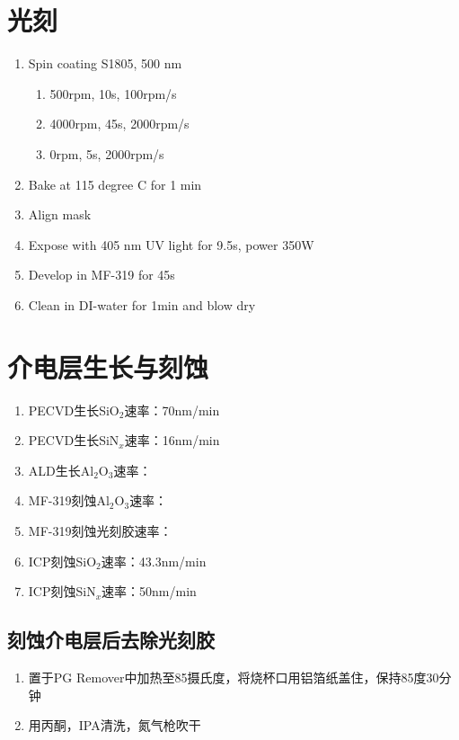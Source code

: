 \section{光刻} %
\label{sec:光刻}
    \begin{enumerate}
        \item Spin coating S1805, 500 nm
        \begin{enumerate}
            \item 500rpm, 10s, 100rpm/s
            \item 4000rpm, 45s, 2000rpm/s
            \item 0rpm, 5s, 2000rpm/s
        \end{enumerate}
        \item Bake at 115 degree C for 1 min
        \item Align mask
        \item Expose with 405 nm UV light for 9.5s, power 350W
        \item Develop in MF-319 for 45s
        \item Clean in DI-water for 1min and blow dry
    \end{enumerate}

\section{介电层生长与刻蚀} %
\label{sec:介电层生长与刻蚀}
    \begin{enumerate}
        \item PECVD生长SiO$_2$速率：70nm/min
        \item PECVD生长SiN$_x$速率：16nm/min
        \item ALD生长Al$_2$O$_3$速率：
        \item MF-319刻蚀Al$_2$O$_3$速率：
        \item MF-319刻蚀光刻胶速率：
        \item ICP刻蚀SiO$_2$速率：43.3nm/min
        \item ICP刻蚀SiN$_x$速率：50nm/min
    \end{enumerate}
    \subsection{刻蚀介电层后去除光刻胶} %
    \label{sub:刻蚀介电层后去除光刻胶}
        \begin{enumerate}
            \item 置于PG Remover中加热至85摄氏度，将烧杯口用铝箔纸盖住，保持85度30分钟
            \item 用丙酮，IPA清洗，氮气枪吹干
        \end{enumerate}

